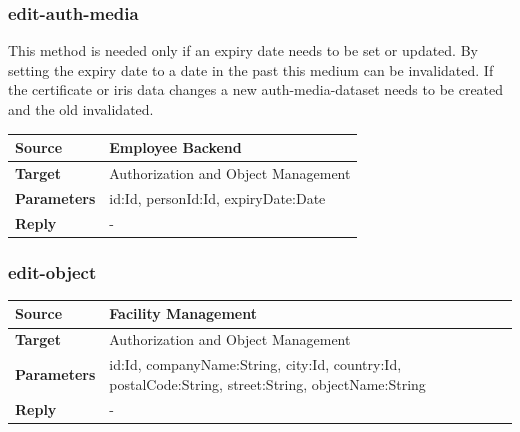 \documentclass[12pt,a4paper,titlepage,oneside]{scrartcl}
\begin{document}
\subsubsection{edit-auth-media}

This method is needed only if an expiry date needs to be set or updated. By setting the expiry date to a date in the past this medium can be invalidated. If the certificate or iris data changes a new auth-media-dataset needs to be created and the old invalidated.

\begin{table}[h]

    \centering

    \begin{tabular}{|l|p{12cm}|} \hline

    \textbf{Source}&Employee Backend\\ \hline

    \textbf{Target}&Authorization and Object Management\\ \hline

    \textbf{Parameters}&id:Id, personId:Id, expiryDate:Date\\ \hline

    \textbf{Reply}&-\\ \hline

    \end{tabular}

\end{table}

\subsubsection{edit-object}

\begin{table}[h]

    \centering

    \begin{tabular}{|l|p{12cm}|} \hline

    \textbf{Source}&Facility Management\\ \hline

    \textbf{Target}&Authorization and Object Management\\ \hline

    \textbf{Parameters}&id:Id, companyName:String, city:Id, country:Id, postalCode:String, street:String, objectName:String\\ \hline

    \textbf{Reply}&-\\ \hline

    \end{tabular}

\end{table}
\end{document}
